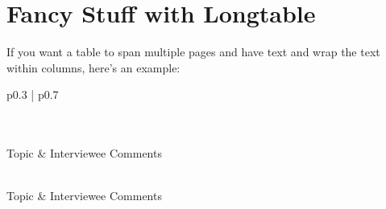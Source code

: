 \section{Fancy Stuff with Longtable}

If you want a table to span multiple pages and have text and wrap the text within columns, here's an example:

\begin{singlespace} %

\begin{center}
\begin{longtable}[c]{p{0.3\linewidth} | p{0.7\linewidth}}
\caption{Sample Interview Records from Field Visits: test}
\label{tab:interviews_test}\\


\hline
{}\\
\hline
Topic                                                                        & Interviewee Comments                                                                                                                                                                                                                                                                                                                                               \\ \hline
\endfirsthead 

\hline
{}\\
\hline
Topic                                                                        & Interviewee Comments                                                                                                                                                                                                                                                                                                                                               \\ \hline
\endhead 


\hline
\endfoot

\hline
{}\\
\hline\hline
\endlastfoot



\end{longtable}
\end{center}
\end{singlespace}
